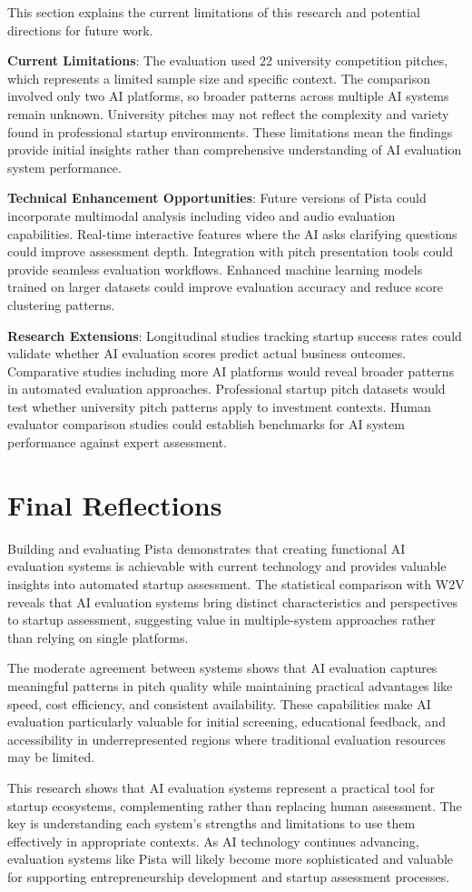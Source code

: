 This section explains the current limitations of this research and potential directions for future work.

\textbf{Current Limitations}: The evaluation used 22 university competition pitches, which represents a limited sample size and specific context. The comparison involved only two AI platforms, so broader patterns across multiple AI systems remain unknown. University pitches may not reflect the complexity and variety found in professional startup environments. These limitations mean the findings provide initial insights rather than comprehensive understanding of AI evaluation system performance.

\textbf{Technical Enhancement Opportunities}: Future versions of Pista could incorporate multimodal analysis including video and audio evaluation capabilities. Real-time interactive features where the AI asks clarifying questions could improve assessment depth. Integration with pitch presentation tools could provide seamless evaluation workflows. Enhanced machine learning models trained on larger datasets could improve evaluation accuracy and reduce score clustering patterns.

\textbf{Research Extensions}: Longitudinal studies tracking startup success rates could validate whether AI evaluation scores predict actual business outcomes. Comparative studies including more AI platforms would reveal broader patterns in automated evaluation approaches. Professional startup pitch datasets would test whether university pitch patterns apply to investment contexts. Human evaluator comparison studies could establish benchmarks for AI system performance against expert assessment.

\section{Final Reflections}
\label{sec:final-thoughts}

Building and evaluating Pista demonstrates that creating functional AI evaluation systems is achievable with current technology and provides valuable insights into automated startup assessment. The statistical comparison with W2V reveals that AI evaluation systems bring distinct characteristics and perspectives to startup assessment, suggesting value in multiple-system approaches rather than relying on single platforms.

The moderate agreement between systems shows that AI evaluation captures meaningful patterns in pitch quality while maintaining practical advantages like speed, cost efficiency, and consistent availability. These capabilities make AI evaluation particularly valuable for initial screening, educational feedback, and accessibility in underrepresented regions where traditional evaluation resources may be limited.

This research shows that AI evaluation systems represent a practical tool for startup ecosystems, complementing rather than replacing human assessment. The key is understanding each system's strengths and limitations to use them effectively in appropriate contexts. As AI technology continues advancing, evaluation systems like Pista will likely become more sophisticated and valuable for supporting entrepreneurship development and startup assessment processes.